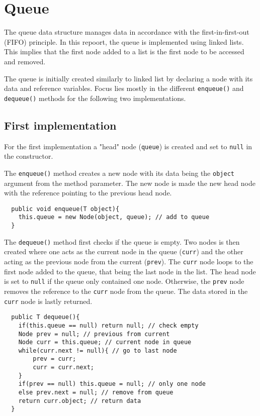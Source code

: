 \documentclass[a4paper,11pt]{article}
\begin{document}
\section*{Queue}

The queue data structure manages data in accordance with the 
first-in-first-out (FIFO) principle. In this repoort, the queue is 
implemented using linked lists. This implies that the first node added 
to a list is the first node to be accessed and removed. 

The queue is initially created similarly to linked list by declaring a
node with its data and reference variables. Focus lies mostly in the 
different {\tt enqueue()} and {\tt dequeue()} methods for the following
two implementations.

\subsection*{First implementation}

For the first implementation a "head" node ({\tt queue}) is created and 
set to {\tt null} in the constructor. 

The {\tt enqueue()} method creates a new node with its data being the
{\tt object} argument from the method parameter. The new node is made
the new head node with the reference pointing to the previous head node.

\begin{verbatim}
  public void enqueue(T object){
    this.queue = new Node(object, queue); // add to queue
  } 
\end{verbatim}

The {\tt dequeue()} method first checks if the queue is empty. Two
nodes is then created where one acts as the current node in the queue
({\tt curr}) and the other acting as the previous node from the current
({\tt prev}). The {\tt curr} node loops to the first node added to the 
queue, that being the last node in the list. The head node is set to 
{\tt null} if the queue only contained one node. Otherwise, the
{\tt prev} node removes the reference to the {\tt curr} node from the
queue. The data stored in the {\tt curr} node is lastly returned.

\begin{verbatim}
  public T dequeue(){
    if(this.queue == null) return null; // check empty
    Node prev = null; // previous from current
    Node curr = this.queue; // current node in queue
    while(curr.next != null){ // go to last node
        prev = curr; 
        curr = curr.next;
    }
    if(prev == null) this.queue = null; // only one node
    else prev.next = null; // remove from queue
    return curr.object; // return data
  }
\end{verbatim}
\end{document}

